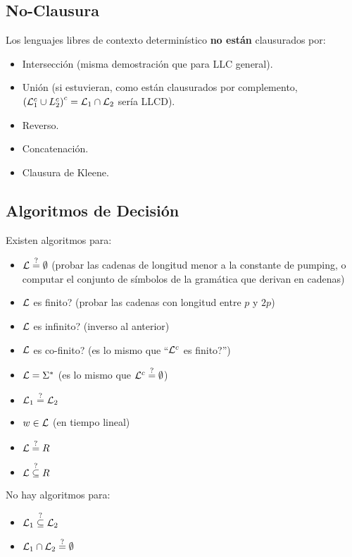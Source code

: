 \subsection{No-Clausura}

Los lenguajes libres de contexto determinístico \textbf{no están} clausurados por:

\begin{itemize}
    \item Intersección (misma demostración que para LLC general).
    \item Unión (si estuvieran, como están clausurados por complemento, $\left(\mathcal{L}_1^c \cup L_2^c\right)^c = \mathcal{L}_1 \cap \mathcal{L}_2$ sería LLCD).
    \item Reverso.
    \item Concatenación.
    \item Clausura de Kleene.
\end{itemize}

\subsection{Algoritmos de Decisión}

Existen algoritmos para:

\begin{itemize}
    \item $\mathcal{L} \overset{?}{=} \emptyset$ (probar las cadenas de longitud menor a la constante de pumping, o computar el conjunto de símbolos de la gramática que derivan en cadenas)
    \item $\mathcal{L}$ es finito? (probar las cadenas con longitud entre $p$ y $2p$)
    \item $\mathcal{L}$ es infinito? (inverso al anterior)
    \item $\mathcal{L}$ es co-finito? (es lo mismo que ``$\mathcal{L}^c$ es finito?'')
    \item $\mathcal{L} = \Sigma^*$ (es lo mismo que $\mathcal{L}^c \overset{?}{=} \emptyset$)
    \item $\mathcal{L}_1 \overset{?}{=} \mathcal{L}_2$
    \item $w \in \mathcal{L}$ (en tiempo lineal)
    \item $\mathcal{L} \overset{?}{=} R$
    \item $\mathcal{L} \overset{?}{\subseteq} R$
\end{itemize}

No hay algoritmos para:
\begin{itemize}
    \item $\mathcal{L}_1 \overset{?}{\subseteq} \mathcal{L}_2$
    \item $\mathcal{L}_1 \cap \mathcal{L}_2 \overset{?}{=} \emptyset$
\end{itemize}
